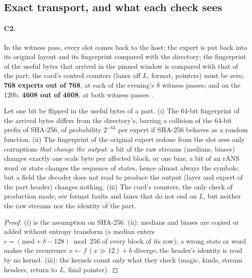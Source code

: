 \subsection{Exact transport, and what each check sees}

\paragraph{C2.} In the witness pass, every slot comes back to the host; the expert is put back into its original layout and its fingerprint compared with the directory; the fingerprint of the useful bytes that arrived in the pinned window is compared with that of the part; the card's control counters (lanes off $L$, format, pointers) must be zero. \textbf{768 experts out of 768}, at each of the evening's 8 witness passes; and on the 120b, \textbf{\num{4608} out of \num{4608}}, at both witness passes \mes.

\begin{proposition}\label{prop:t2c-controles}
Let one bit be flipped in the useful bytes of a part. (i) The 64-bit fingerprint of the arrived bytes differs from the directory's, barring a collision of the 64-bit prefix of SHA-256, of probability $2^{-64}$ per expert if SHA-256 behaves as a random function. (ii) The fingerprint of the original expert redone from the slot sees only corruptions \emph{that change the output}: a bit of the raw streams (medians, biases) changes exactly one scale byte per affected block, or one bias; a bit of an rANS word or state changes the sequence of states, hence almost always the symbols; but a field the decoder does not read to produce the output (layer and expert of the part header) changes nothing. (iii) The card's counters, the only check of production mode, see format faults and lanes that do not end on $L$, but neither the raw streams nor the identity of the part.
\end{proposition}

\begin{proof}
(i) is the assumption on SHA-256. (ii): medians and biases are copied or added without entropy transform (a median enters $e = (\text{med} + \delta - 128) \bmod 256$ of every block of its row); a wrong state or word makes the recurrence $x \leftarrow f\,(x \gg 12) + b$ diverge; the header's identity is read by no kernel. (iii): the kernels count only what they check (magic, kinds, stream headers, return to $L$, final pointer).
\end{proof}

